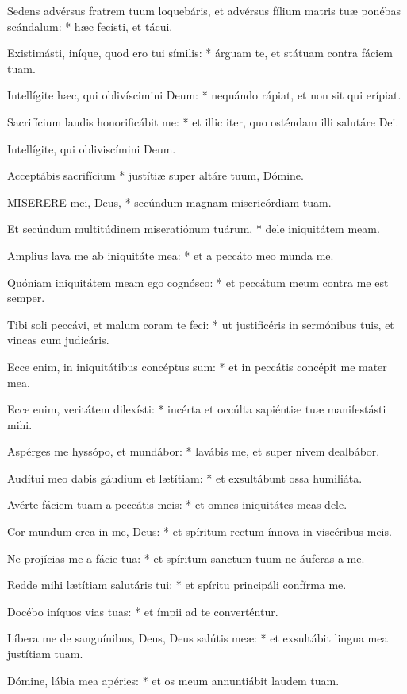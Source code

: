 Sedens advérsus fratrem tuum loquebáris, et advérsus fílium matris tuæ ponébas scándalum: * hæc fecísti, et tácui.

Existimásti, iníque, quod ero tui símilis: * árguam te, et státuam contra fáciem tuam.

Intellígite hæc, qui oblivíscimini Deum: * nequándo rápiat, et non sit qui erípiat.

Sacrifícium laudis honorificábit me: * et illic iter, quo osténdam illi salutáre Dei.

 Intellígite, qui obliviscímini Deum.

 Acceptábis sacrifícium * justítiæ super altáre tuum, Dómine.


\lettrine[lines=2]{M}{ISERERE} mei, Deus, * secúndum magnam misericórdiam tuam.

Et secúndum multitúdinem miseratiónum tuárum, * dele iniquitátem meam.

Amplius lava me ab iniquitáte mea: * et a peccáto meo munda me.

Quóniam iniquitátem meam ego cognósco: * et peccátum meum contra me est semper.

Tibi soli peccávi, et malum coram te feci: * ut justificéris in sermónibus tuis, et vincas cum judicáris.

Ecce enim, in iniquitátibus concéptus sum: * et in peccátis concépit me mater mea.

Ecce enim, veritátem dilexísti: * incérta et occúlta sapiéntiæ tuæ manifestásti mihi.

Aspérges me hyssópo, et mundábor: * lavábis me, et super nivem dealbábor.

Audítui meo dabis gáudium et lætítiam: * et exsultábunt ossa humiliáta.

Avérte fáciem tuam a peccátis meis: * et omnes iniquitátes meas dele.

Cor mundum crea in me, Deus: * et spíritum rectum ínnova in viscéribus meis.

Ne projícias me a fácie tua: * et spíritum sanctum tuum ne áuferas a me.

Redde mihi lætítiam salutáris tui: * et spíritu principáli confírma me.

Docébo iníquos vias tuas: * et ímpii ad te converténtur.

Líbera me de sanguínibus, Deus, Deus salútis meæ: * et exsultábit lingua mea justítiam tuam.

Dómine, lábia mea apéries: * et os meum annuntiábit laudem tuam.

